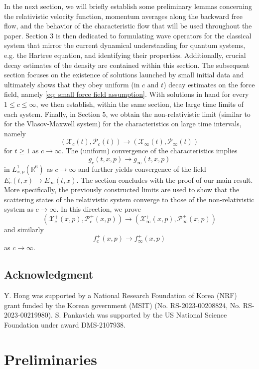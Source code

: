 \documentclass[reqno, 11pt, letterpaper]{amsart}
\theoremstyle{remark}
\numberwithin{equation}{section}
\numberwithin{theorem}{section}
\numberwithin{table}{section}
\numberwithin{figure}{section}
\begin{document}
In the next section, we will briefly establish some preliminary lemmas concerning the relativistic velocity function, momentum averages along the backward free flow, and the behavior of the characteristic flow that will be used throughout the paper.
Section $3$ is then dedicated to formulating wave operators for the classical system that mirror the current dynamical understanding for quantum systems, e.g. the Hartree equation, and identifying their properties.
Additionally, crucial decay estimates of the density are contained within this section.
The subsequent section focuses on the existence of solutions launched by small initial data and ultimately shows that they obey uniform (in $c$ and $t$) decay estimates on the force field, namely \eqref{eq: small force field assumption}.
With solutions in hand for every $1 \leq c \leq \infty$, we then establish, within the same section, the large time limits of each system.
Finally, in Section $5$, we obtain the non-relativistic limit (similar to \cite{Degond, Schaeffer} for the Vlasov-Maxwell system) for the characteristics on large time intervals, namely 
$$(\mathcal{X}_c(t), \mathcal{P}_c(t)) \to (\mathcal{X}_\infty(t), \mathcal{P}_\infty(t))$$ 
for $t \geq 1$ as $c \to \infty$.
The (uniform) convergence of the characteristics implies
$$g_c(t,x,p) \to g_\infty(t,x,p)$$
in $L^1_{x,p}(\mathbb{R}^6)$ as $c \to \infty$
and further yields convergence of the field $E_c(t,x) \to E_\infty(t,x)$.
The section concludes with the proof of our main result. More specifically, the previously constructed limits are used to show
that the scattering states of the relativistic system converge to those of the non-relativistic system as $c \to \infty$.
In this direction, we prove
$$(\mathcal{X}_c^+(x,p), \mathcal{P}_c^+(x,p)) \to (\mathcal{X}_\infty^+(x,p), \mathcal{P}_\infty^+(x,p))$$
and similarly
$$f_c^+(x,p) \to f_\infty^+(x,p)$$
as $c \to \infty$.


\subsection{Acknowledgment}
Y. Hong was supported by a National Research Foundation of Korea (NRF) grant funded by the Korean government (MSIT) (No. RS-2023-00208824, No. RS-2023-00219980).
S. Pankavich was supported by the US National Science Foundation under award DMS-2107938.
 
\section{Preliminaries}
\end{document}
